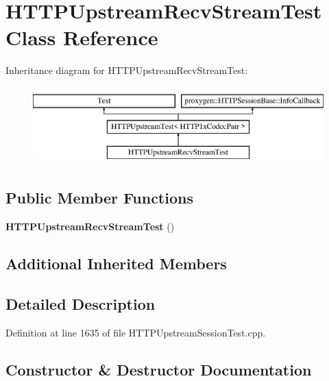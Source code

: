 \section{H\+T\+T\+P\+Upstream\+Recv\+Stream\+Test Class Reference}
\label{classHTTPUpstreamRecvStreamTest}
Inheritance diagram for H\+T\+T\+P\+Upstream\+Recv\+Stream\+Test\+:\begin{figure}[H]
\begin{center}
\leavevmode
\includegraphics[height=3.000000cm]{classHTTPUpstreamRecvStreamTest}
\end{center}
\end{figure}
\subsection*{Public Member Functions}
\begin{DoxyCompactItemize}
\item 
{\bf H\+T\+T\+P\+Upstream\+Recv\+Stream\+Test} ()
\end{DoxyCompactItemize}
\subsection*{Additional Inherited Members}


\subsection{Detailed Description}


Definition at line 1635 of file H\+T\+T\+P\+Upstream\+Session\+Test.\+cpp.



\subsection{Constructor \& Destructor Documentation}
